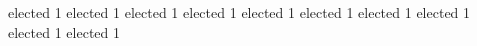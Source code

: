 \setDate          {\today}

           {elected}     {1}       {}
           {elected}     {1}       {}
           {elected}     {1}       {}
           {elected}     {1}       {}
           {elected}     {1}       {}
           {elected}     {1}       {}
           {elected}     {1}       {}
           {elected}     {1}       {}
           {elected}     {1}       {}
           {elected}     {1}       {}




